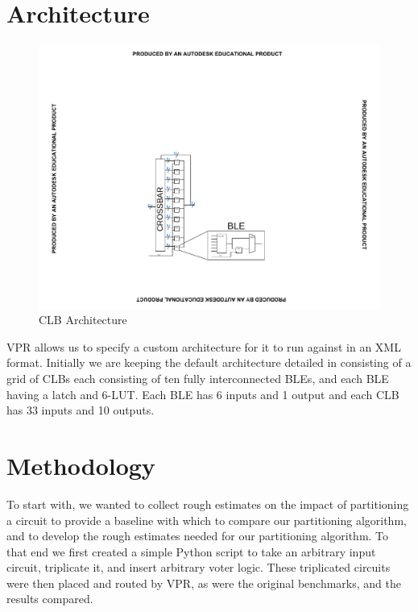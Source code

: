 \documentclass[12pt,final,oneside]{memoir} %
\begin{document}
\section{Architecture}\label{ArchFile}
\begin{figure}
    \begin{center}
        \includegraphics[clip,trim=8cm 4cm 8cm 8cm]{images/CLB.pdf}
        \caption{\ac{CLB} Architecture}
        \label{Arch}
    \end{center}
\end{figure}
\ac{VPR} allows us to specify a custom architecture for it to run against in an XML format. Initially we are keeping the default architecture detailed in \cite{VPRManual} consisting of a grid of \acp{CLB} each consisting of ten fully interconnected \acp{BLE}, and each \ac{BLE} having a latch and 6-\ac{LUT}.
Each \ac{BLE} has 6 inputs and 1 output and each \ac{CLB} has 33 inputs and 10 outputs.



\section{Methodology}\label{BenchmarkMethod}
To start with, we wanted to collect rough estimates on the impact of partitioning a circuit to provide a baseline with which to compare our partitioning algorithm, and to develop the rough estimates needed for our partitioning algorithm. To that end we first created a simple Python script to take an arbitrary input circuit, triplicate it, and insert arbitrary voter logic. These triplicated circuits were then placed and routed by \ac{VPR}, as were the original benchmarks, and the results compared.
\end{document}
